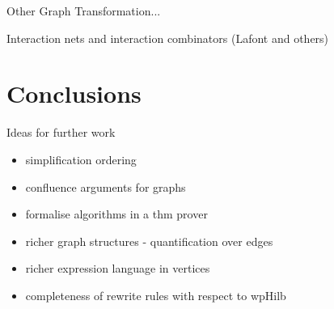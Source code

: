 \documentclass[runningheads]{llncs}
\begin{document}
Other Graph Transformation...

Interaction nets and interaction combinators (Lafont and others)

\section{Conclusions}
\label{sec:conclusions}

Ideas for further work
\begin{itemize}
\item simplification ordering
\item confluence arguments for graphs
\item formalise algorithms in a thm prover
\item richer graph structures - quantification over edges
\item richer expression language in vertices
\item completeness of rewrite rules with respect to wpHilb
\end{itemize}



\end{document}
